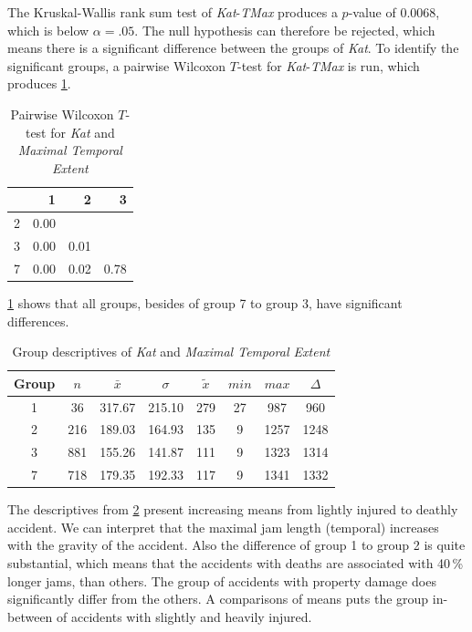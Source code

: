 The Kruskal-Wallis rank sum test of \textit{Kat}-\textit{TMax} produces a $p$-value of 0.0068, which is below $\alpha=.05$. The null hypothesis can therefore be rejected, which means there is a significant difference between the groups of \textit{Kat}. To identify the significant groups, a pairwise Wilcoxon $T$-test for \textit{Kat}-\textit{TMax} is run, which produces \cref{tbl:wilcoxon_baysis_matched_Kat_TMax}.
\begin{table}[ht]
	\tiny
	\centering
	\begin{tabular}{rrrr}
	  	\toprule
	 	& 1 & 2 & 3 \\ 
	  	\midrule
		2 & 0.00 &  &  \\ 
	  	3 & 0.00 & 0.01 &  \\ 
	  	7 & 0.00 & 0.02 & 0.78 \\ 
	   	\bottomrule
	\end{tabular}
	\caption{Pairwise Wilcoxon $T$-test for \textit{Kat} and \textit{Maximal Temporal Extent}}
	\label{tbl:wilcoxon_baysis_matched_Kat_TMax}
\end{table}
\cref{tbl:wilcoxon_baysis_matched_Kat_TMax} shows that all groups, besides of group 7 to group 3, have significant differences. 
\begin{table}[ht]
	\tiny
	\centering
	\begin{tabular}{c|c|c|c|c|c|c|c}
		\toprule
		Group & $n$ & $\bar{x}$ & $\sigma$ & $\tilde{x}$ & $min$ & $max$ & $\Delta$ \\   
	  	\midrule
		1 & 36  & 317.67 & 215.10 & 279 & 27 & 987  & 960 \\ 
	  	2 & 216 & 189.03 & 164.93 & 135 & 9  & 1257 & 1248 \\ 
	  	3 & 881 & 155.26 & 141.87 & 111 & 9  & 1323 & 1314 \\ 
	  	7 & 718 & 179.35 & 192.33 & 117 & 9  & 1341 & 1332 \\ 
	   	\bottomrule
	\end{tabular}
	\caption{Group descriptives of \textit{Kat} and \textit{Maximal Temporal Extent}}
	\label{tbl:descriptives_baysis_matched_Kat_TMax}
\end{table}
The descriptives from \cref{tbl:descriptives_baysis_matched_Kat_TMax} present increasing means from lightly injured to deathly accident. We can interpret that the maximal jam length (temporal) increases with the gravity of the accident. Also the difference of group 1 to group 2 is quite substantial, which means that the accidents with deaths are associated with 40\,\% longer jams, than others. The group of accidents with property damage does significantly differ from the others. A comparisons of means puts the group in-between of accidents with slightly and heavily injured.


